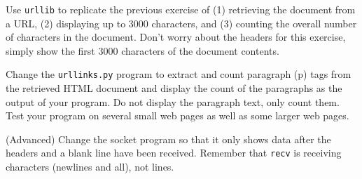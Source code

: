 \begin{ex}
Use {\tt urllib} to replicate the previous exercise of (1) retrieving the document
from a URL, (2) displaying up to 3000 characters, and (3) counting the overall number
of characters in the document.  Don't worry about the headers for this exercise, simply
show the first 3000 characters of the document contents.
\end{ex}

\begin{ex}
Change the {\tt urllinks.py} program to extract and count 
paragraph (p) tags from the retrieved HTML document and 
display the count of the paragraphs as the 
output of your program.  
Do not display the paragraph text, only count them.
Test your program on several small web pages
as well as some larger web pages.
\end{ex}

\begin{ex}
(Advanced) Change the socket program so that it only shows data after the 
headers and a blank line have been received.  Remember that {\tt recv} is
receiving characters (newlines and all), not lines.
\end{ex}


